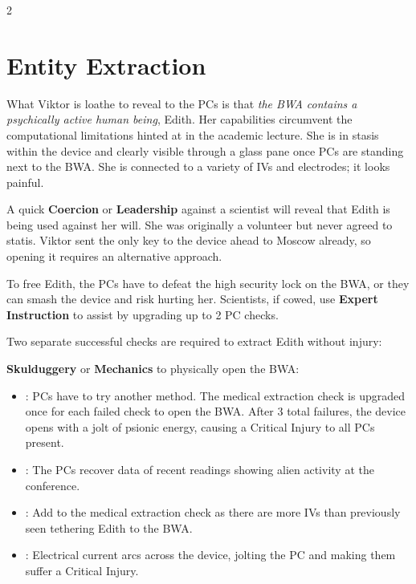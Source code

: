 \documentclass{book}
\newcommand{\df}{\DifficultyDie }
\newcommand{\stb}{\SetbackDie }
\newcommand{\bbb}{\BoostDie }
\begin{document}
\begin{multicols*}{2}
\section{Entity Extraction}

What Viktor is loathe to reveal to the PCs is that \emph{the BWA contains a psychically active human being}, Edith.  Her capabilities circumvent the computational limitations  hinted at in the academic lecture.  She is in stasis within the device and clearly visible through a glass pane once PCs are standing next to the BWA.  She is connected to a variety of IVs and electrodes; it looks painful.

A quick \df\df\df\bbb \textbf{Coercion} or \df\df\df\bbb \textbf{Leadership} against a scientist will reveal that Edith is being used against her will.  She was originally a volunteer but never agreed to statis.  Viktor sent the only key to the device ahead to Moscow already, so opening it requires an alternative approach.

To free Edith, the PCs have to defeat the high security lock on the BWA, or they can smash the device and risk hurting her.  Scientists, if cowed, use \textbf{Expert Instruction} to assist by upgrading up to 2 PC checks.

Two separate successful checks are required to extract Edith without injury:

\df\df\df\stb \textbf{Skulduggery} or \df\df\df\df \textbf{Mechanics} to physically open the BWA:
    \begin{itemize}
    \setlength\itemsep{-.5em}
    \item \Failure: PCs have to try another method.  The medical extraction check is upgraded once for each failed check to open the BWA.  After 3 total failures, the device opens with a jolt of psionic energy, causing a Critical Injury to all PCs present.
        \item \Advantage\Advantage: The PCs recover data of recent readings showing alien activity at the conference.
        \item \Threat\Threat: Add \stb to the medical extraction check as there are more IVs than previously seen tethering Edith to the BWA.
        \item \Despair: Electrical current arcs across the device, jolting the PC and making them suffer a Critical Injury.
    \end{itemize}


\end{multicols*}
\end{document}
